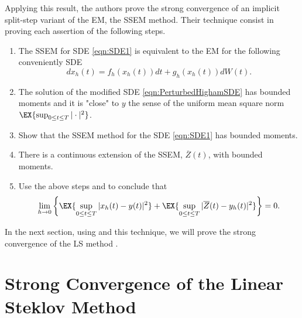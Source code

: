 \documentclass[3p]{elsarticle}
\theoremstyle{definition}
\theoremstyle{plain}%
\theoremstyle{remark}
\newcommand{\SM}{LS\xspace}
\begin{document}
	Applying this result, the authors prove the strong convergence of an implicit split-step variant of the EM, the
SSEM method. 
Their technique consist in proving each assertion of the following steps.
\begin{enumerate}[\bf{Step} 1:]
	\item
		\label{stp:EMCorrespondence}
		The SSEM for SDE \eqref{eqn:SDE1} is equivalent to the EM for the following conveniently SDE
		\begin{equation}\label{eqn:PerturbedHighamSDE}
			dx_h(t)= f_h(x_h(t))dt +g_h(x_h(t))dW(t).
		\end{equation}
	\item\label{stp:PerturbedSolution}
			The solution of the modified SDE \eqref{eqn:PerturbedHighamSDE} has bounded moments and it is 
			"close" to  $y$ the sense of the uniform mean square norm 
			$
				\EX{\sup_{0\leq t\leq T}|\cdot|^2}
			$.
	\item
	\label{stp:MethodBoundedMoments}
		Show that the SSEM method for the SDE \eqref{eqn:SDE1} has bounded moments.
	\item
		There is a continuous extension of the SSEM, $\overline{Z}(t)$, with bounded moments.
	\item
		Use the above steps and  to conclude that
		\begin{equation}
			\lim_{h\to 0}
			\left\{
				\EX{\sup_{0\leq t\leq T}|x_h(t)-y(t)|^2}
			+
			\EX{\sup_{0\leq t\leq T}|\overline{Z}(t) -y_h(t)|^2}
			\right\}=0.
		\end{equation}
\end{enumerate}

	In the next section, using  and this technique, we will prove the strong convergence of the 
\SM method .


\section{Strong Convergence of the Linear Steklov Method} 
\end{document}
